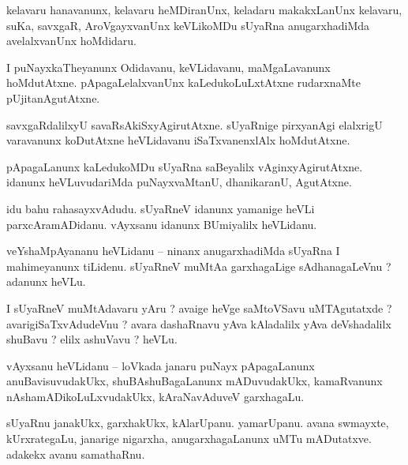 \documentclass{article}
\begin{document}
\begin{mng}%
kelavaru hanavanunx, kelavaru heMDiranUnx, keladaru makakxLanUnx kelavaru, suKa, savxgaR, 
AroVgayxvanUnx keVLikoMDu sUyaRna anugarxhadiMda avelalxvanUnx hoMdidaru.
\end{mng}

\begin{mng}%
I puNayxkaTheyanunx Odidavanu, keVLidavanu, maMgaLavanunx hoMdutAtxne. pApagaLelalxvanUnx 
kaLedukoLuLxtAtxne rudarxnaMte pUjitanAgutAtxne.
\end{mng}

\begin{mng}%
savxgaRdalilxyU savaRsAkiSxyAgirutAtxne. sUyaRnige pirxyanAgi elalxrigU varavanunx koDutAtxne 
heVLidavanu iSaTxvanenxlAlx hoMdutAtxne.
\end{mng}

\begin{mng}%
pApagaLanunx kaLedukoMDu sUyaRna saBeyalilx vAginxyAgirutAtxne. idanunx heVLuvudariMda 
puNayxvaMtanU, dhanikaranU, AgutAtxne.
\end{mng}

\begin{mng}%
idu bahu rahasayxvAdudu. sUyaRneV idanunx yamanige heVLi parxcAramADidanu. vAyxsanu idanunx 
BUmiyalilx heVLidanu.
\end{mng}


\begin{mng}%
veYshaMpAyananu heVLidanu -- ninanx anugarxhadiMda sUyaRna I mahimeyanunx tiLidenu. sUyaRneV 
muMtAa garxhagaLige sAdhanagaLeVnu ? adanunx heVLu.
\end{mng}

\begin{mng}%
I sUyaRneV muMtAdavaru yAru ? avaige heVge saMtoVSavu uMTAgutatxde ? avarigiSaTxvAdudeVnu ? avara 
dashaRnavu yAva kAladalilx yAva deVshadalilx shuBavu ? elilx ashuVavu ? heVLu.
\end{mng}

\begin{mng}%
vAyxsanu heVLidanu -- loVkada janaru puNayx pApagaLanunx anuBavisuvudakUkx, shuBAshuBagaLanunx 
mADuvudakUkx, kamaRvanunx nAshamADikoLuLxvudakUkx, kAraNavAduveV garxhagaLu.
\end{mng}

\begin{mng}%
sUyaRnu janakUkx, garxhakUkx, kAlarUpanu. yamarUpanu. avana swmayxte, kUrxrategaLu, janarige 
nigarxha, anugarxhagaLanunx uMTu mADutatxve. adakekx avanu samathaRnu.
\end{mng}
\end{document}
